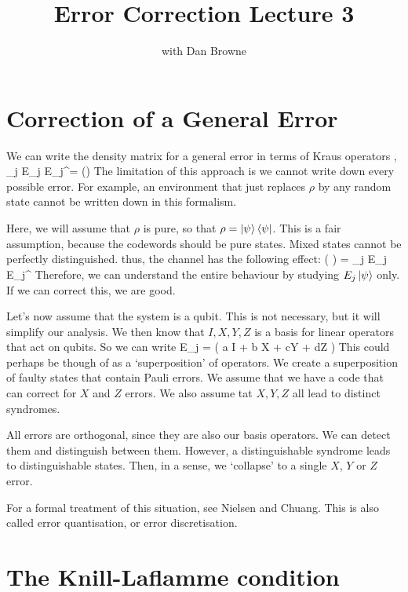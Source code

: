 


\title{Error Correction Lecture 3}
\author{with Dan Browne}
\maketitle
\tableofcontents
\section{Correction of a General Error}

We can write the density matrix for a general error in terms of Kraus operators
, 
\beq
\rho \rightarrow \sum_j E_j \rho E_j^\dagger = \Sigma(\rho)
\eeq
The limitation of this approach is we cannot write down every possible error. For example, an environment that just replaces $\rho$ by any random state cannot be written down in this formalism. 

Here, we will assume that $\rho$ is pure, so that $\rho = \ket{\psi}\bra{\psi} $. This is a fair assumption, because the codewords should be pure states. Mixed states cannot be perfectly distinguished. thus, the channel has the following effect:
\beq
\Sigma \left( \ket{\psi}\bra{\psi}\right) = \sum_j E_j \ket{\psi}\bra{\psi} E_j^\dagger
\eeq
Therefore, we can understand the entire behaviour by studying $E_j \ket{\psi}$ only. If we can correct this, we are good. 

Let's now assume that the system is a qubit. This is not necessary, but it will simplify our analysis. We then know that $I,X,Y,Z$  is a basis for linear operators that act on qubits. So we can write
\beq
E_j\ket{\psi} = \left( a I + b X + cY + dZ \right) \ket{\psi}
\eeq
This could perhaps be though of as a `superposition' of operators. We create a superposition of faulty states that contain Pauli errors. We assume that  we have a code that can correct for $X$ and $Z$ errors. We also assume tat $X,Y,Z$ all lead to distinct syndromes. 



All errors are orthogonal, since they are also our basis operators. We can detect them and distinguish between them. However, a distinguishable syndrome leads to distinguishable states. Then, in a sense, we `collapse' to a single $X$, $Y$ or $Z$ error. 

For a formal treatment of this situation, see Nielsen and Chuang. This is also called error quantisation, or error discretisation. 

\section{The Knill-Laflamme condition}


